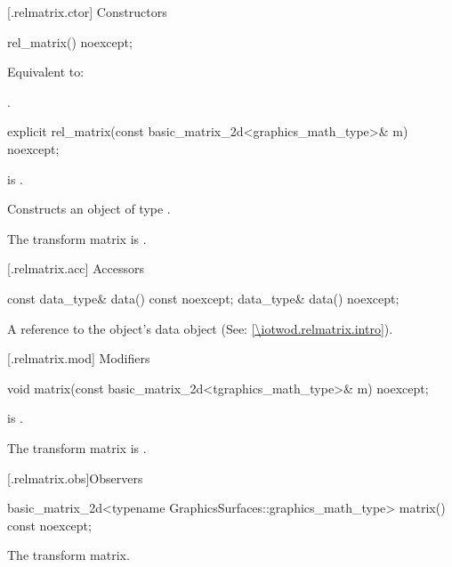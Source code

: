  [\iotwod.relmatrix.ctor] {Constructors}%

%
\begin{itemdecl}
rel_matrix() noexcept;
\end{itemdecl}
\begin{itemdescr}
\pnum
\effects Equivalent to:  

\pnum
\postconditions {}.
\end{itemdescr}

%
\begin{itemdecl}
explicit rel_matrix(const basic_matrix_2d<graphics_math_type>& m) noexcept;
\end{itemdecl}
\begin{itemdescr}
\pnum
\requires {} is .

\pnum
\effects Constructs an object of type .

\pnum
\remarks The transform matrix is .
\end{itemdescr}

 [\iotwod.relmatrix.acc] {Accessors}%

%
\begin{itemdecl}
const data_type& data() const noexcept;
data_type& data() noexcept;
\end{itemdecl}
\begin{itemdescr}
\pnum
\returns A reference to the  object's data object (See: \ref{\iotwod.relmatrix.intro}).
\end{itemdescr}

 [\iotwod.relmatrix.mod] {Modifiers}%

%
\begin{itemdecl}
void matrix(const basic_matrix_2d<tgraphics_math_type>& m) noexcept;
\end{itemdecl}
\begin{itemdescr}
\pnum
\requires {} is .

\pnum
\effects The transform matrix is .
\end{itemdescr}

 [\iotwod.relmatrix.obs]{Observers}%

%
\begin{itemdecl}
basic_matrix_2d<typename GraphicsSurfaces::graphics_math_type> matrix() const noexcept;
\end{itemdecl}
\begin{itemdescr}
\pnum
\returns The transform matrix.
\end{itemdescr}

